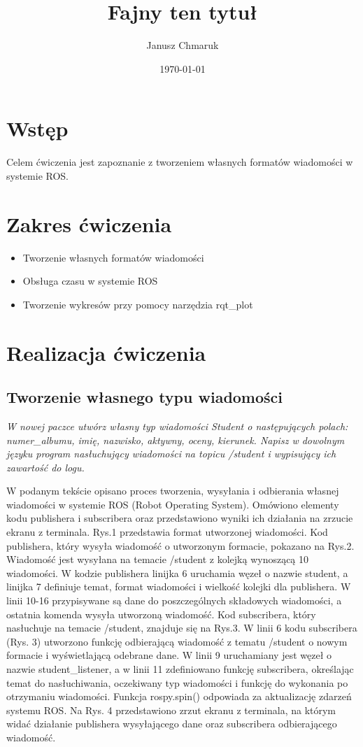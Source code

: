 \documentclass[10pt,a4paper,twoside,twocolumn]{article}%
\title{Fajny ten tytuł}%
\date{\today}%
\author{Janusz Chmaruk}%
\begin{document}

\null%

\clearpage%

\tableofcontents%

\section{Wstęp}
Celem ćwiczenia jest zapoznanie z tworzeniem własnych formatów wiadomości w
systemie ROS.
\section{Zakres ćwiczenia}
\begin{itemize}
    \item Tworzenie własnych formatów wiadomości
    \item Obsługa czasu w systemie ROS
    \item Tworzenie wykresów przy pomocy narzędzia rqt\_plot
\end{itemize}
\section{Realizacja ćwiczenia}
\subsection{Tworzenie własnego typu wiadomości}
\textit{W nowej paczce utwórz własny typ wiadomości Student o następujących
polach: numer\_albumu, imię, nazwisko, aktywny, oceny, kierunek. Napisz w
dowolnym języku program nasłuchujący wiadomości na topicu /student i wypisujący
ich zawartość do logu.}



W podanym tekście opisano proces tworzenia, wysyłania i odbierania własnej
wiadomości w systemie ROS (Robot Operating System). Omówiono elementy kodu
publishera i subscribera oraz przedstawiono wyniki ich działania na zrzucie
ekranu z terminala. Rys.1 przedstawia format utworzonej wiadomości. Kod
publishera, który wysyła wiadomość o utworzonym formacie, pokazano na Rys.2.
Wiadomość jest wysyłana na temacie /student z kolejką wynoszącą 10 wiadomości. W
kodzie publishera linijka 6 uruchamia węzeł o nazwie student, a linijka 7
definiuje temat, format wiadomości i wielkość kolejki dla publishera. W linii
10-16 przypisywane są dane do poszczególnych składowych wiadomości, a ostatnia
komenda wysyła utworzoną wiadomość. Kod subscribera, który nasłuchuje na temacie
/student, znajduje się na Rys.3. W linii 6 kodu subscribera (Rys. 3) utworzono
funkcję odbierającą wiadomość z tematu /student o nowym formacie i wyświetlającą
odebrane dane. W linii 9 uruchamiany jest węzeł o nazwie student\_listener, a w
linii 11 zdefiniowano funkcję subscribera, określając temat do nasłuchiwania,
oczekiwany typ wiadomości i funkcję do wykonania po otrzymaniu wiadomości.
Funkcja rospy.spin() odpowiada za aktualizację zdarzeń systemu ROS. Na Rys. 4
przedstawiono zrzut ekranu z terminala, na którym widać działanie publishera
wysyłającego dane oraz subscribera odbierającego wiadomość.
\end{document}
